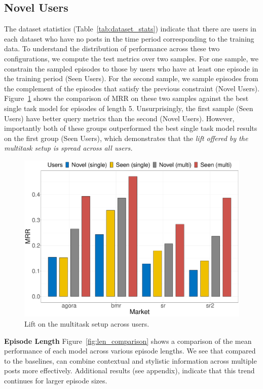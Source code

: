 \subsection{Novel Users}
The dataset statistics (Table~\ref{tab:dataset_stats}) indicate that there are users in each dataset who have no posts in the time period corresponding to the training data. 
To understand the distribution of performance across these two configurations, we compute the test metrics over two samples.
For one sample, we constrain the sampled episodes to those by users who have at least one episode in the training period (Seen Users).
For the second sample, we sample episodes from the complement of the episodes that satisfy the previous constraint (Novel Users).
Figure~\ref{fig:novel_vs_train_comparison} shows the comparison of MRR on these two samples against the best single task model for episodes of length 5. 
Unsurprisingly, the first sample (Seen Users) have better query metrics than the second (Novel Users).
However, importantly both of these groups outperformed the best single task model results on the first group (Seen Users), which demonstrates that the {\it lift offered by the multitask setup is spread across all users.} 

\begin{figure}
    \centering
    \includegraphics[width=0.8\linewidth]{sysml/plots/novel_vs_train_vs_single.pdf}
    \caption{Lift on the multitask setup across users.}
    \label{fig:novel_vs_train_comparison}
\end{figure}

\noindent \textbf{Episode Length}  Figure~\ref{fig:len_comparison} shows a comparison of the mean performance of each model across various episode lengths. We see that compared to the baselines, \SYSMLmethodname{} can combine contextual and stylistic information across multiple posts more effectively. Additional results (see appendix),  indicate that this trend continues for larger episode sizes.

